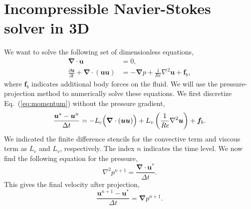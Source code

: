 \documentclass[fleqn,a4paper]{article} %
\numberwithin{equation}{section} %
\numberwithin{figure}{section} %
\numberwithin{algorithm}{section} %
\begin{document}
\section{Incompressible Navier-Stokes solver in 3D}
We want to solve the following set of dimensionless equations,
\begin{equation}\label{eq:momentum}
\begin{split}
    \bm{\nabla}\cdot \bm{u} &= 0,\\
    \frac{\partial \bm{u}}{\partial t} + \bm{\nabla}\cdot\left(\bm{u} \bm{u}\right) &= -\bm{\nabla}p + \frac{1}{\textit{Re}}\nabla^2 \bm{u} + \bm{f}_b,
\end{split}
\end{equation}
where $\bm{f}_b$ indicates additional body forces on the fluid. We will use the pressure-projection method to numerically solve these equations. We first discretize Eq.~(\ref{eq:momentum}) without the pressure gradient,
\begin{equation}
    \frac{\bm{u}^* - \bm{u}^{n}}{\Delta t} = -L_c\Bigl(\bm{\nabla}\cdot\left(\bm{u} \bm{u}\right)\Bigr) + L_v\left(\frac{1}{\textit{Re}}\nabla^2 \bm{u}\right) + \bm{f}_b. 
\end{equation}
We indicated the finite difference stencils for the convective term and viscous term as $L_c$ and $L_v$, respectively. The index $n$ indicates the time level. We now find the following equation for the pressure,
\begin{equation}\label{eq:poisson}
    \nabla^2 p^{n+1} = \frac{ \bm{\nabla}\cdot \bm{u}^*}{\Delta t}.
\end{equation}
This gives the final velocity after projection,
\begin{equation}
    \frac{\bm{u}^{n+1} - \bm{u}^*}{\Delta t} = \bm{\nabla}p^{n+1}. 
\end{equation}
\end{document}
